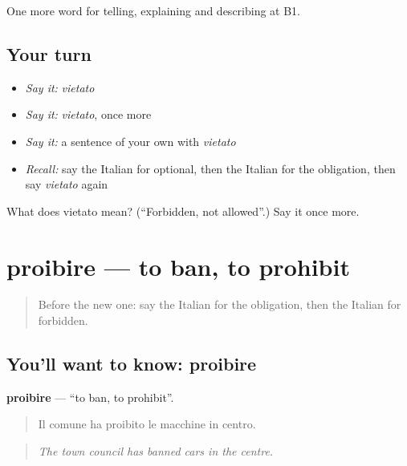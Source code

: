 \begin{grammarlens}[title={What you've built}]
One more word for telling, explaining and describing at B1.
\end{grammarlens}

\subsection*{Your turn}
\begin{itemize}
\raggedright
  \item \emph{Say it:} \emph{vietato}
  \item \emph{Say it:} \emph{vietato}, once more
  \item \emph{Say it:} a sentence of your own with \emph{vietato}
  \item \emph{Recall:} say the Italian for optional, then the Italian for the obligation, then say \emph{vietato} again
\end{itemize}

\begin{tcolorbox}[breakable,colback=teal!4,colframe=teal!35!black,title={Before you move on}]
What does vietato mean? (\textquotedblleft{}Forbidden, not allowed\textquotedblright{}.) Say it once more.
\end{tcolorbox}
\section[proibire]{proibire — to ban, to prohibit}

\label{lesson:IT-C385-proibire}



\begin{quote}
Before the new one: say the Italian for the obligation, then the Italian for forbidden.
\end{quote}

\subsection*{You'll want to know: proibire}
\textbf{proibire} — \textquotedblleft{}to ban, to prohibit\textquotedblright{}.

\begin{quote}
Il comune ha proibito le macchine in centro.
\end{quote}

\begin{quote}
\emph{The town council has banned cars in the centre.}
\end{quote}

